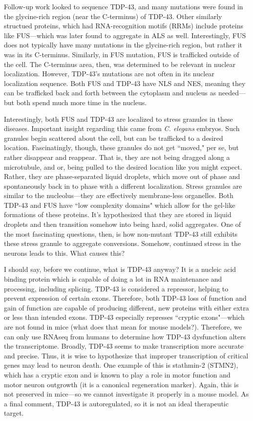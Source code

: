 Follow-up work looked to sequence TDP-43, and many mutations were found in the glycine-rich region (near the C-terminus) of TDP-43. Other similarly structued proteins, which had RNA-recognition motifs (RRMs) include proteins like FUS---which was later found to aggregate in ALS as well. Interestingly, FUS does not typically have many mutations in the glycine-rich region, but rather it was in its C-terminus. Similarly, in FUS mutation, FUS is trafficked outside of the cell. The C-terminus area, then, was determined to be relevant in nuclear localization. However, TDP-43's mutations are not often in its nuclear localization sequence. Both FUS and TDP-43 have NLS and NES, meaning they can be trafficked back and forth between the cytoplasm and nucleus as needed---but both spend much more time in the nucleus.\newline

Interestingly, both FUS and TDP-43 are localized to stress granules in these diseases. Important insight regarding this came from \textit{C. elegans} embryos. Such granules begin scattered about the cell, but can be trafficked to a desired location. Fascinatingly, though, these granules do not get ``moved," per se, but rather disappear and reappear. That is, they are not being dragged along a microtubule, and or, being pulled to the desired location like you might expect. Rather, they are phase-separated liquid droplets, which move out of phase and spontaneously back in to phase with a different localization. Stress granules are similar to the nucleolus---they are effectively membrane-less organelles. Both TDP-43 and FUS have ``low complexity domains" which allow for the gel-like formations of these proteins. It's hypothesized that they are stored in liquid droplets and then transition somehow into being hard, solid aggregates. One of the most fascinating questions, then, is how non-mutant TDP-43 still exhibits these stress granule to aggregate conversions. Somehow, continued stress in the neurons leads to this. What causes this?\newline

I should say, before we continue, what is TDP-43 anyway? It is a nucleic acid binding protein which is capable of doing a lot in RNA maintenance and processing, including splicing. TDP-43 is considered a repressor, helping to prevent expression of certain exons. Therefore, both TDP-43 loss of function and gain of function are capable of producing different, new proteins with either extra or less than intended exons. TDP-43 especially represses ``cryptic exons"---which are not found in mice (what does that mean for mouse models?). Therefore, we can only use RNAseq from humans to determine how TDP-43 dysfunction alters the transcriptome. Broadly, TDP-43 seems to make transcription more accurate and precise. Thus, it is wise to hypothesize that improper transcription of critical genes may lead to neuron death. One example of this is stathmin-2 (STMN2), which has a cryptic exon and is known to play a role in motor function and motor neuron outgrowth (it is a canonical regeneration marker). Again, this is not preserved in mice---so we cannot investigate it properly in a mouse model. As a final comment, TDP-43 is autoregulated, so it is not an ideal therapeutic target. 


